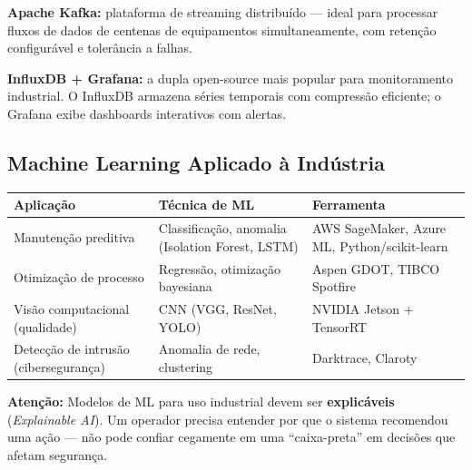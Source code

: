 \textbf{Apache Kafka:} plataforma de streaming distribuído --- ideal para processar fluxos de dados de centenas de equipamentos simultaneamente, com retenção configurável e tolerância a falhas.

\textbf{InfluxDB + Grafana:} a dupla open-source mais popular para monitoramento industrial. O InfluxDB armazena séries temporais com compressão eficiente; o Grafana exibe dashboards interativos com alertas.

\subsection{Machine Learning Aplicado à Indústria}\label{machine-learning-aplicado-uxe0-induxfastria}

\begin{longtable}[]{@{}
  >{\raggedright\arraybackslash}p{}
  >{\raggedright\arraybackslash}p{}
  >{\raggedright\arraybackslash}p{}@{}}
\toprule\noalign{}
\begin{minipage}[b]{\linewidth}\raggedright
Aplicação
\end{minipage} & \begin{minipage}[b]{\linewidth}\raggedright
Técnica de ML
\end{minipage} & \begin{minipage}[b]{\linewidth}\raggedright
Ferramenta
\end{minipage} \\
\midrule\noalign{}
\endhead
\bottomrule\noalign{}
\endlastfoot
Manutenção preditiva & Classificação, anomalia (Isolation Forest, LSTM) & AWS SageMaker, Azure ML, Python/scikit-learn \\
Otimização de processo & Regressão, otimização bayesiana & Aspen GDOT, TIBCO Spotfire \\
Visão computacional (qualidade) & CNN (VGG, ResNet, YOLO) & NVIDIA Jetson + TensorRT \\
Detecção de intrusão (cibersegurança) & Anomalia de rede, clustering & Darktrace, Claroty \\
\end{longtable}

\begin{caixaatencao}

\textbf{Atenção:} Modelos de ML para uso industrial devem ser \textbf{explicáveis} (\emph{Explainable AI}). Um operador precisa entender por que o sistema recomendou uma ação --- não pode confiar cegamente em uma ``caixa-preta'' em decisões que afetam segurança.

\end{caixaatencao}

